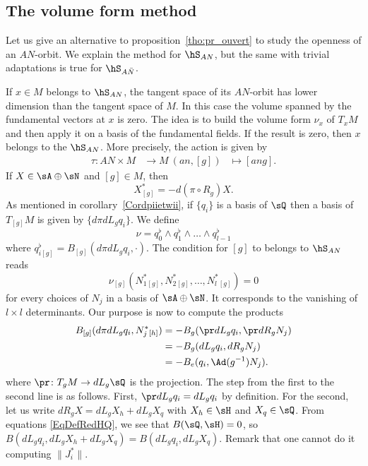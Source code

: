 \subsection{The volume form method}    \label{subsecVolumeForm}

Let us give an alternative to proposition~\ref{tho:pr_ouvert} to study the openness of an $AN$-orbit. We explain the method for $\hS_{AN}$, but the same with trivial adaptations is true for $\hS_{A\bar{N}}$.

If $x\in M$ belongs to $\hS_{AN}$, the tangent space of its $AN$-orbit has lower dimension than the tangent space of $M$.  In this case the volume spanned by the fundamental vectors at $x$ is zero.  The idea is to build the volume form $\nu_x$ of $T_xM$ and then apply it on a basis of the fundamental fields.  If the result is zero, then $x$ belongs to the $\hS_{AN}$.  More precisely, the action is given by
\begin{equation}
	\begin{aligned}
		\tau \colon AN\times M & \to M\
		(an,[g])               & \mapsto [ang].
	\end{aligned}
\end{equation}
If $X\in\sA\oplus\sN$ and $[g]\in M$, then
\begin{equation}
	X^*_{[g]}=-d(\pi\circ R_g)X.
\end{equation}
As mentioned in corollary~\ref{Cordpiietwii}, if $\{q_i\}$ is a basis of $\sQ$ then a basis of $T_{[g]}M$ is given by $\{d\pi dL_gq_i\}$. We define
\[
	\nu=q_0^{\flat}\wedge q_1^{\flat}\wedge \ldots \wedge
	q_{l-1}^{\flat}
\]
where $q_{i[g]}^{\flat}=B_{[g]}(d\pi dL_g q_i,\cdot)$. The condition for $[g]$ to belongs to $\hS_{AN}$ reads
\begin{equation}\label{eq:nusurN}
	\nu_{[g]}(N_1^*{}_{[g]},N_2^*{}_{[g]},\ldots,N_l^*{}_{[g]})=0
\end{equation}
for every choices of $N_j$ in a basis of $\sA\oplus\sN$. It corresponds to the vanishing of $l \times l$ determinants. Our purpose is now to compute the products
\[
	\begin{split}
		B_{[g]}(d\pi dL_g q_i,N^*_j{}_{[h]}) & =-B_g(\pr dL_g q_i,\pr dR_g N_j) \\
		                                     & =-B_g(dL_g q_i,dR_g N_j)         \\
		                                     & =-B_e(q_i,\Ad(g^{-1})N_j).
	\end{split}
\]
where $\pr\colon T_{g}M\to dL_{g}\sQ$ is the projection. The step from the first to the second line is as follows. First, $\pr dL_gq_i=dL_gq_i$ by definition. For the second, let us write $dR_g X=dL_g X_h+dL_g X_q$ with $X_h\in\sH$ and $X_q\in\sQ$. From equations \eqref{EqDefRedHQ}, we see that $B(\sQ,\sH)=0$, so $B(dL_g q_i,dL_g X_h+dL_g X_q)=B(dL_g q_i,dL_g X_q)$. Remark that one cannot do it computing $\|J_i^*\|$.

